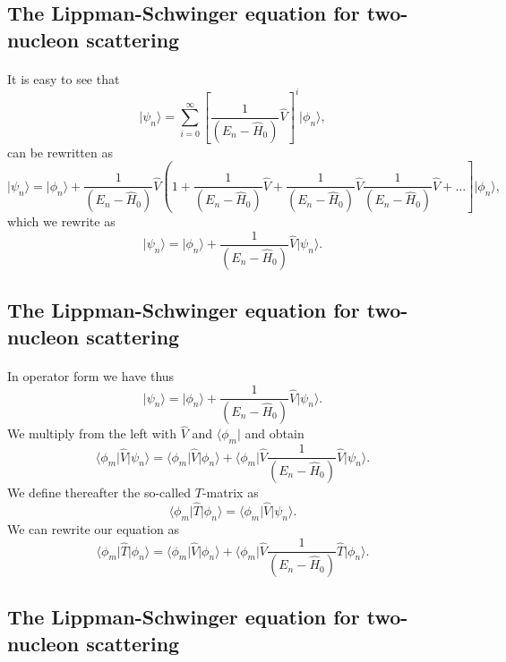 \documentclass[%
twoside,                 %
final,                   %
10pt]{article}
\begin{document}
\subsection*{The Lippman-Schwinger equation for two-nucleon scattering}

\paragraph{}
It is easy to see that 
\[
\vert \psi_n \rangle =\sum_{i=0}^{\infty}\left[\frac{1}{(E_n -\hat{H}_0)}\hat{V}\right]^i\vert \phi_n \rangle,
\]
can be rewritten as 
\[
\vert \psi_n \rangle =\vert\phi_n \rangle+\frac{1}{( E_n -\hat{H}_0)}
\hat{V}\left(1+ \frac{1}{(E_n -\hat{H}_0)}\hat{V}+\frac{1}{(E_n -\hat{H}_0)}\hat{V}\frac{1}{(E_n -\hat{H}_0)}\hat{V}+\dots\right]\vert \phi_n \rangle,
\]
which we rewrite as 
\[
\vert \psi_n \rangle =\vert\phi_n \rangle+\frac{1}{(E_n -\hat{H}_0)}\hat{V}\vert \psi_n \rangle.
\]



\subsection*{The Lippman-Schwinger equation for two-nucleon scattering}

\paragraph{}
In operator form we have thus
\[
\vert \psi_n \rangle =\vert\phi_n \rangle+\frac{1}{(E_n -\hat{H}_0)}\hat{V}\vert \psi_n \rangle.
\]
We multiply from the left with $\hat{V}$ and $\langle \phi_m \vert$ and obtain
\[
\langle \phi_m \vert\hat{V}\vert \psi_n \rangle =\langle \phi_m \vert\hat{V}\vert\phi_n \rangle+\langle \phi_m \vert\hat{V}\frac{1}{(E_n -\hat{H}_0)}\hat{V}\vert \psi_n \rangle.
\]
We define thereafter the so-called $T$-matrix as
\[
\langle \phi_m \vert\hat{T}\vert \phi_n \rangle=\langle \phi_m \vert\hat{V}\vert \psi_n \rangle.
\]
We can rewrite our equation as
\[
\langle \phi_m \vert\hat{T}\vert \phi_n \rangle =\langle \phi_m \vert\hat{V}\vert\phi_n \rangle+\langle \phi_m \vert\hat{V}\frac{1}{(E_n -\hat{H}_0)}\hat{T}\vert \phi_n \rangle.
\]



\subsection*{The Lippman-Schwinger equation for two-nucleon scattering}
\end{document}
